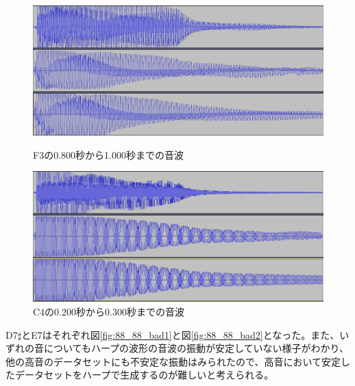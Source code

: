 \begin{figure}[b]
\begin{center}
\begin{minipage}{0.48\hsize}
\begin{center}
\includegraphics[width=0.9\hsize]{figure/88_88/f3.png}
\caption{F3の0.800秒から1.000秒までの音波}
\label{fig:88_88_good1}
\end{center}
\end{minipage}
\begin{minipage}{0.48\hsize}
\begin{center}
\includegraphics[width=0.9\hsize]{figure/88_88/c4.png}
\caption{C4の0.200秒から0.300秒までの音波}
\label{fig:88_88_good2}
\end{center}
\end{minipage}
\end{center}
\end{figure}

D7$\sharp$とE7はそれぞれ図\ref{fig:88_88_bad1}と図\ref{fig:88_88_bad2}となった。また、いずれの音についてもハープの波形の音波の振動が安定していない様子がわかり、他の高音のデータセットにも不安定な振動はみられたので、高音において安定したデータセットをハープで生成するのが難しいと考えられる。

